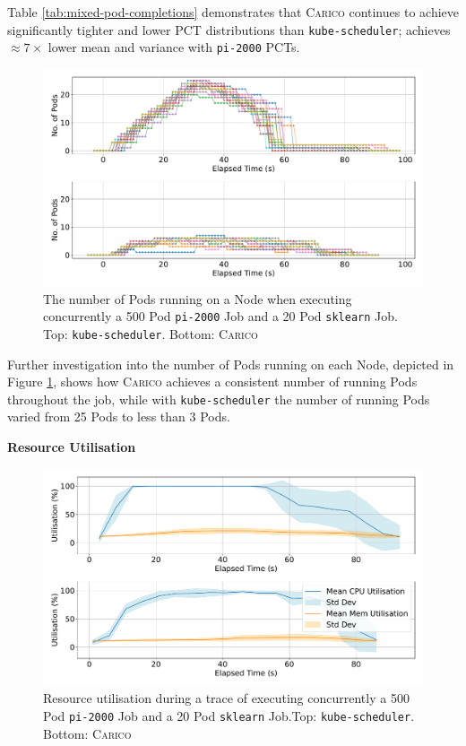 Table \ref{tab:mixed-pod-completions} demonstrates that \textsc{Carico}
continues to achieve significantly tighter and lower PCT distributions than
\texttt{kube-scheduler}; achieves $\approx 7 \times$ lower mean and variance with
\texttt{pi-2000} PCTs.


\begin{figure}[ht!]
    \centering
    \includegraphics[width=\textwidth]{images/mixed-running-pods.pdf}
    \caption{The number of Pods running on a Node when executing concurrently a
    500 Pod \texttt{pi-2000} Job and a 20 Pod \texttt{sklearn} Job. Top:
    \texttt{kube-scheduler}. Bottom: \textsc{Carico}}
    \label{fig:mixed-pod-running}
\end{figure}

Further investigation into the number of Pods running on each Node, depicted in
Figure \ref{fig:mixed-pod-running}, shows how \textsc{Carico} achieves a
consistent number of running Pods throughout the job, while with
\texttt{kube-scheduler} the number of running Pods varied from 25 Pods to less
than 3 Pods.

\textbf{Resource Utilisation}\\
\begin{figure}[ht!]
    \centering
    \includegraphics[width=\textwidth]{images/mixed-util.pdf}
    \caption{Resource utilisation during a trace of executing concurrently a 500
    Pod \texttt{pi-2000} Job and a 20 Pod \texttt{sklearn} Job.Top:
    \texttt{kube-scheduler}. Bottom: \textsc{Carico}}
    \label{fig:mixed-util}
\end{figure}

